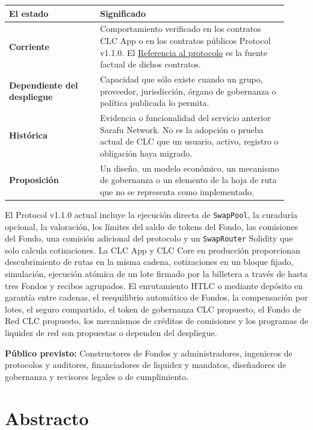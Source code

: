 \documentclass[11pt]{article}
\begin{document}
\begin{longtable}{P{0.30\linewidth} P{0.62\linewidth}}
\toprule
El estado & Significado \\
\midrule
\endhead
\textbf{Corriente} & Comportamiento verificado en los contratos CLC App o en los contratos públicos Protocol v1.1.0. El \href{https://docs.cosmolocal.credit/es/protocol/overview}{Referencia al protocolo} es la fuente factual de dichos contratos. \\
\textbf{Dependiente del despliegue} & Capacidad que sólo existe cuando un grupo, proveedor, jurisdicción, órgano de gobernanza o política publicada lo permita. \\
\textbf{Histórica} & Evidencia o funcionalidad del servicio anterior Sarafu Network. No es la adopción o prueba actual de CLC que un usuario, activo, registro o obligación haya migrado. \\
\textbf{Proposición} & Un diseño, un modelo económico, un mecanismo de gobernanza o un elemento de la hoja de ruta que no se representa como implementado. \\
\bottomrule
\end{longtable}

El Protocol v1.1.0 actual incluye la ejecución directa de \texttt{SwapPool}, la curaduría opcional, la valoración, los límites del saldo de tokens del Fondo, las comisiones del Fondo, una comisión adicional del protocolo y un \texttt{SwapRouter} Solidity que solo calcula cotizaciones. La CLC App y CLC Core en producción proporcionan descubrimiento de rutas en la misma cadena, cotizaciones en un bloque fijado, simulación, ejecución atómica de un lote firmado por la billetera a través de hasta tres Fondos y recibos agrupados. El enrutamiento HTLC o mediante depósito en garantía entre cadenas, el reequilibrio automático de Fondos, la compensación por lotes, el seguro compartido, el token de gobernanza CLC propuesto, el Fondo de Red CLC propuesto, los mecanismos de créditos de comisiones y los programas de liquidez de red son propuestas o dependen del despliegue.

\textbf{Público previsto:} Constructores de Fondos y administradores, ingenieros de protocolos y auditores, financiadores de liquidez y mandatos, diseñadores de gobernanza y revisores legales o de cumplimiento.

\section*{Abstracto}
\end{document}
